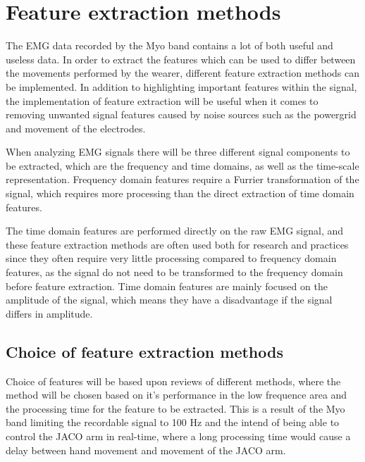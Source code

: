 \section{Feature extraction methods}


The EMG data recorded by the Myo band contains a lot of both useful and useless data. In order to extract the features which can be used to differ between the movements performed by the wearer, different feature extraction methods can be implemented. In addition to highlighting important features within the signal, the implementation of feature extraction will be useful when it comes to removing unwanted signal features caused by noise sources such as the powergrid and movement of the electrodes. \cite{phiny2012}

When analyzing EMG signals there will be three different signal components to be extracted, which are the frequency and time domains, as well as the time-scale representation. Frequency domain features require a Furrier transformation of the signal, which requires more processing than the direct extraction of time domain features. \cite{phiny2012}

The time domain features are performed directly on the raw EMG signal, and these feature extraction methods are often used both for research and practices since they often require very little processing compared to frequency domain features, as the signal do not need to be transformed to the frequency domain before feature extraction. Time domain features are mainly focused on the amplitude of the signal, which means they have a disadvantage if the signal differs in amplitude. \cite{phiny2012}

\subsection{Choice of feature extraction methods}

Choice of features will be based upon reviews of different methods, where the method will be chosen based on it's performance in the low frequence area and the processing time for the feature to be extracted. This is a result of the Myo band limiting the recordable signal to 100 Hz and the intend of being able to control the JACO arm in real-time, where a long processing time would cause a delay between hand movement and movement of the JACO arm.